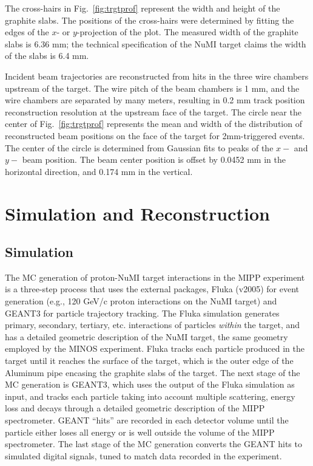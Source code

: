 \documentclass[%
aps, prd, reprint, show pacs, preprint numbers, ams math, amssymb, superscriptaddress, linenumbers]{revtex4-1}
\begin{document}
The cross-hairs in Fig.~\ref{fig:trgtprof} represent the width and height
of the graphite slabs.  The positions of the cross-hairs were determined 
by fitting the edges of the $x$- or $y$-projection of the plot.  The measured
width of the graphite slabs is 6.36 mm; the technical specification of the NuMI
target claims the width of the slabs is 6.4 mm.  

Incident beam trajectories are reconstructed from hits in the three wire chambers upstream of the target.  The 
wire pitch of the beam chambers is 1 mm, and the wire chambers are separated by many meters, resulting in 0.2 mm track position reconstruction resolution at the upstream face of the target.  The circle near the center of 
Fig.~\ref{fig:trgtprof} represents the mean and width of the distribution of reconstructed beam positions on the 
face of the target for 2mm-triggered events.  The center of the circle is determined from Gaussian fits to 
peaks of the $x-$ and $y-$ beam position.  The beam center position is offset by 0.0452 mm
in the horizontal direction, and 0.174 mm in the vertical.  

\section{Simulation and Reconstruction}
\subsection{Simulation}
The MC generation of proton-NuMI target interactions in the MIPP experiment is a three-step process that uses 
the external packages, Fluka (v2005) for event 
generation (e.g., 120 GeV/c proton interactions on the NuMI target) and GEANT3 for particle trajectory tracking.  
The Fluka simulation generates primary, secondary, tertiary, etc. interactions of particles \emph{within} the target, 
and has a detailed geometric description of the NuMI target, the same geometry employed by the MINOS 
experiment.  Fluka tracks each particle produced in the target until it reaches the surface of the target, which is 
the outer edge of the Aluminum pipe encasing the graphite slabs of the target.  The next stage of the MC 
generation is GEANT3, which uses the output of the Fluka simulation as input, and tracks each particle taking 
into account multiple scattering, energy loss and decays through a detailed geometric description of the MIPP 
spectrometer.  GEANT ``hits'' are recorded in each detector volume until the particle either loses all energy or is 
well outside the volume of the MIPP spectrometer.  The last stage of the MC generation converts the GEANT hits 
to simulated digital signals, tuned to match data recorded in the experiment.
\end{document}
